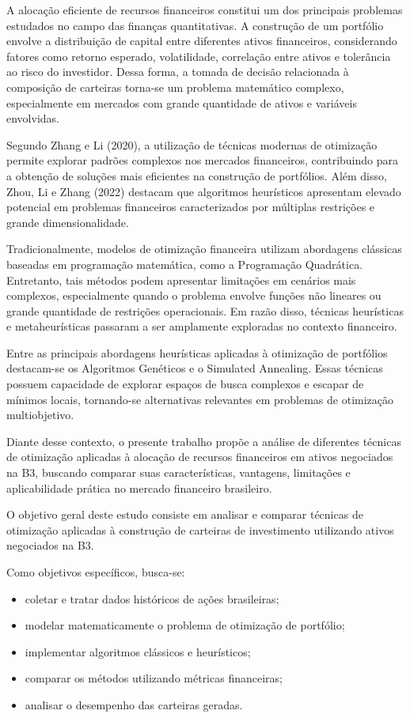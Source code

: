 ﻿\documentclass[
  12pt,
  oneside,
  a4paper,
  brazil
]{abntex2}
\begin{document}
A alocação eficiente de recursos financeiros constitui um dos principais problemas estudados no campo das finanças quantitativas. A construção de um portfólio envolve a distribuição de capital entre diferentes ativos financeiros, considerando fatores como retorno esperado, volatilidade, correlação entre ativos e tolerância ao risco do investidor. Dessa forma, a tomada de decisão relacionada à composição de carteiras torna-se um problema matemático complexo, especialmente em mercados com grande quantidade de ativos e variáveis envolvidas.

Segundo Zhang e Li (2020), a utilização de técnicas modernas de otimização permite explorar padrões complexos nos mercados financeiros, contribuindo para a obtenção de soluções mais eficientes na construção de portfólios. Além disso, Zhou, Li e Zhang (2022) destacam que algoritmos heurísticos apresentam elevado potencial em problemas financeiros caracterizados por múltiplas restrições e grande dimensionalidade.

Tradicionalmente, modelos de otimização financeira utilizam abordagens clássicas baseadas em programação matemática, como a Programação Quadrática. Entretanto, tais métodos podem apresentar limitações em cenários mais complexos, especialmente quando o problema envolve funções não lineares ou grande quantidade de restrições operacionais. Em razão disso, técnicas heurísticas e metaheurísticas passaram a ser amplamente exploradas no contexto financeiro.

Entre as principais abordagens heurísticas aplicadas à otimização de portfólios destacam-se os Algoritmos Genéticos e o Simulated Annealing. Essas técnicas possuem capacidade de explorar espaços de busca complexos e escapar de mínimos locais, tornando-se alternativas relevantes em problemas de otimização multiobjetivo.

Diante desse contexto, o presente trabalho propõe a análise de diferentes técnicas de otimização aplicadas à alocação de recursos financeiros em ativos negociados na B3, buscando comparar suas características, vantagens, limitações e aplicabilidade prática no mercado financeiro brasileiro.

O objetivo geral deste estudo consiste em analisar e comparar técnicas de otimização aplicadas à construção de carteiras de investimento utilizando ativos negociados na B3.

Como objetivos específicos, busca-se:
\begin{itemize}
  \item coletar e tratar dados históricos de ações brasileiras;
  \item modelar matematicamente o problema de otimização de portfólio;
  \item implementar algoritmos clássicos e heurísticos;
  \item comparar os métodos utilizando métricas financeiras;
  \item analisar o desempenho das carteiras geradas.
\end{itemize}
\end{document}
